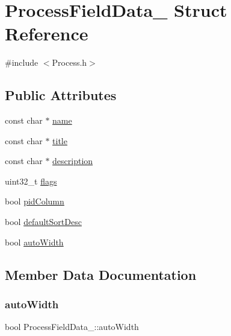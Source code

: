 \hypertarget{structProcessFieldData__}{}\section{Process\+Field\+Data\+\_\+ Struct Reference}
\label{structProcessFieldData__}


{\ttfamily \#include $<$Process.\+h$>$}

\subsection*{Public Attributes}
\begin{DoxyCompactItemize}
\item 
const char $\ast$ \hyperlink{structProcessFieldData___abb00f3aae4128f0d363b875ac14bc8fb}{name}
\item 
const char $\ast$ \hyperlink{structProcessFieldData___a022c5103f9aa9b35814bd0baed04d09f}{title}
\item 
const char $\ast$ \hyperlink{structProcessFieldData___ae41d221f18086ee9b5dcea5db9b8a09a}{description}
\item 
uint32\+\_\+t \hyperlink{structProcessFieldData___a861a3f5719f6b751e6f3da32377f0952}{flags}
\item 
bool \hyperlink{structProcessFieldData___a417d65473a337bf426a468a139bfda79}{pid\+Column}
\item 
bool \hyperlink{structProcessFieldData___a73ed17e6397459e098feb5bbe9b74d46}{default\+Sort\+Desc}
\item 
bool \hyperlink{structProcessFieldData___a9ca7eddc16909b6f0a65c9276505635b}{auto\+Width}
\end{DoxyCompactItemize}


\subsection{Member Data Documentation}
\mbox{\label{structProcessFieldData___a9ca7eddc16909b6f0a65c9276505635b}} 
\subsubsection{\texorpdfstring{auto\+Width}{autoWidth}}
{\footnotesize\ttfamily bool Process\+Field\+Data\+\_\+\+::auto\+Width}

